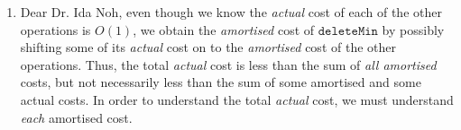 \documentclass[12 pt, letterpaper]{hmcpset}
\begin{document}
\begin{solution}
\begin{enumerate}
			$\mathtt{newHeap}()$ adds $1$ heap, so has potential delta $1 = O(1)$.

			$\mathtt{insert}(x, h)$ adds $1$ heap, so has potential delta $1 = O(1)$.

			$\mathtt{findMin}()$ does not add any heaps, so has potential delta $0 < O(1)$.

			$\mathtt{union}(h_{1}, h_{2})$ removes $2$ heaps and replaces them with $1$. Thus, it has potential delta $-1 < O(1)$.

		\item Dear Dr. Ida Noh, even though we know the \emph{actual} cost of each of the other operations is $O(1)$, we obtain the \emph{amortised} cost of $\mathtt{deleteMin}$ by possibly shifting some of its \emph{actual} cost on to the \emph{amortised} cost of the other operations. Thus, the total \emph{actual} cost is less than the sum of \emph{all amortised} costs, but not necessarily less than the sum of some amortised and some actual costs. In order to understand the total \emph{actual} cost, we must understand \emph{each} amortised cost.
	\end{enumerate}
\end{solution}
\end{document}
